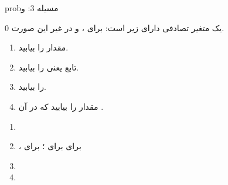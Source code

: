 \begin{PSbox}[unbreakable]{prob}{مسیله 3:  و }

یک متغیر تصادفی دارای  زیر است:\PSbr{} برای ، و در غیر این صورت 0.

\begin{enumerate}
\def\labelenumi{(\PSalph{enumi})}
\tightlist
\item
  مقدار  را بیابید.
\item
  تابع  یعنی  را بیابید.
\item
   را بیابید.
\item
  مقدار  را بیابید که در آن .
\end{enumerate}

\PSsolution{} 

\begin{enumerate}
\def\labelenumi{(\PSalph{enumi})}
\item
\item
  ، برای \PSbr{} برای ؛  برای 
\item
\item
\end{enumerate}

\end{PSbox}

